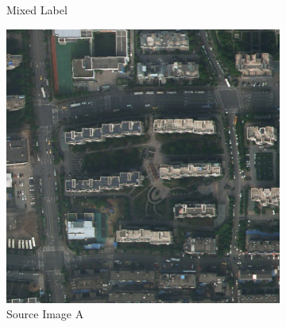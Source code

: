 \documentclass[10pt,twocolumn,letterpaper]{article}
\begin{document}
{\begin{figure}[t]
\begin{minipage}{0.48\textwidth}
\begin{subfigure}[b]{0.4\textwidth}
                \caption{Mixed Label}
            \end{subfigure}
            \caption{DACS Pictures: Source, Target with Pseudo-labels and Mixed Images}
            \label{fig:DACS}
        \end{minipage}
        \hfill
        \begin{minipage}{0.48\textwidth} 
            \centering
            \captionsetup{font=small}
            \begin{subfigure}[b]{0.4\textwidth}
                \includegraphics[width=\textwidth]{images/1410.png}
                \caption{Source Image A}
                \label{fig:image1410}
            \end{subfigure}
            \hspace{2mm}
            \begin{subfigure}[b]{0.4\textwidth}

\end{subfigure}
\end{minipage}
\end{figure}}
\end{document}

